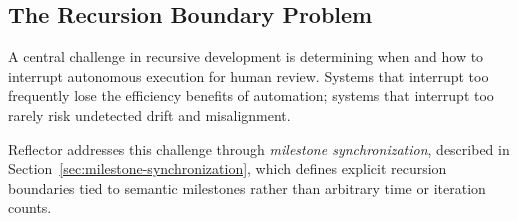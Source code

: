 \subsection{The Recursion Boundary Problem}

A central challenge in recursive development is determining when and how to interrupt
autonomous execution for human review. Systems that interrupt too frequently lose the
efficiency benefits of automation; systems that interrupt too rarely risk undetected
drift and misalignment.

Reflector addresses this challenge through \textit{milestone synchronization}, described
in Section~\ref{sec:milestone-synchronization}, which defines explicit recursion
boundaries tied to semantic milestones rather than arbitrary time or iteration counts.
